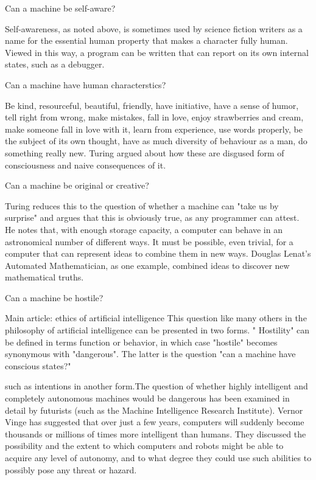 \documentclass{article}
\begin{document}
Can a machine be self-aware?

Self-awareness, as noted above, is sometimes used by science fiction writers as a name for the essential human property that makes a character fully human. Viewed in this way, a program can be written that can report on its own internal states, such as a debugger.\par

Can a machine have human characterstics?

Be kind, resourceful, beautiful, friendly, have initiative, have a sense of humor, tell right from wrong, make mistakes, fall in love, enjoy strawberries and cream, make someone fall in love with it, learn from experience, use words properly, be the subject of its own thought, have as much diversity of behaviour as a man, do something really new.
Turing argued about how these are disgused form of consciousness and naive consequences of it.

Can a machine be original or creative?


Turing reduces this to the question of whether a machine can "take us by surprise" and argues that this is obviously true, as any programmer can attest.
 He notes that, with enough storage capacity, a computer can behave in an astronomical number of different ways. It must be possible, even trivial, for a computer that can represent ideas to combine them in new ways. 
Douglas Lenat's Automated Mathematician, as one example, combined ideas to discover new mathematical truths.

Can a machine be hostile?

Main article: ethics of artificial intelligence This question like many others in the philosophy of artificial intelligence can be presented in two forms. "
Hostility" can be defined in terms function or behavior, in which case "hostile" becomes synonymous with "dangerous".
The latter is the question "can a machine have conscious states?" 


such as intentions in another form.The question of whether highly intelligent and completely autonomous machines would be dangerous has been examined in detail by futurists (such as the Machine Intelligence Research Institute).
Vernor Vinge has suggested that over just a few years, computers will suddenly become thousands or millions of times more intelligent than humans.
They discussed the possibility and the extent to which computers and robots might be able to acquire any level of autonomy, and to what degree they could use such abilities to possibly pose any threat or hazard.
\end{document}

